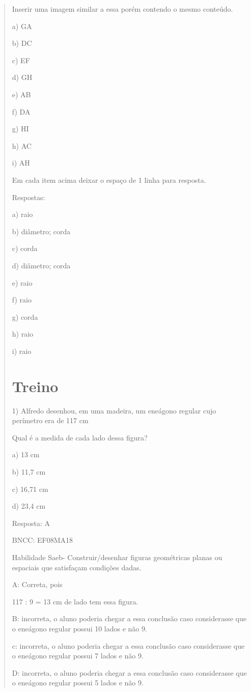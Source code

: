 \begin{quote}
\begin{escolha}
Inserir uma imagem similar a essa porém contendo o mesmo conteúdo.

a) GA

b) DC

c) EF

d) GH

e) AB

f) DA

g) HI

h) AC

i) AH

Em cada item acima deixar o espaço de 1 linha para resposta.

Respostas:

a) raio

b) diâmetro; corda

c) corda

d) diâmetro; corda

e) raio

f) raio

g) corda

h) raio

i) raio

\section{Treino}

1) Alfredo desenhou, em uma madeira, um eneágono regular cujo perímetro
era de 117 cm

Qual é a medida de cada lado dessa figura?

a) 13 cm

b) 11,7 cm

c) 16,71 cm

d) 23,4 cm

Resposta: A

BNCC: EF08MA18

Habilidade Saeb- Construir/desenhar figuras geométricas planas ou
espaciais que satisfaçam condições dadas.

A: Correta, pois

117 : 9 = 13 cm de lado tem essa figura.

B: incorreta, o aluno poderia chegar a essa conclusão caso considerasse
que o eneágono regular possui 10 lados e não 9.

c: incorreta, o aluno poderia chegar a essa conclusão caso considerasse
que o eneágono regular possui 7 lados e não 9.

D: incorreta, o aluno poderia chegar a essa conclusão caso considerasse
que o eneágono regular possui 5 lados e não 9.


\end{escolha}
\end{quote}
